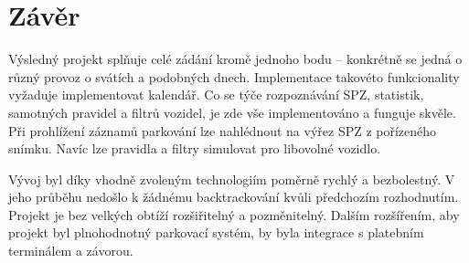 \chapter*{Závěr}

Výsledný projekt splňuje celé zádání kromě jednoho bodu -- konkrétně se jedná o
různý provoz
o svátích a podobných dnech. Implementace takovéto funkcionality
vyžaduje implementovat kalendář.
Co se týče rozpoznávání SPZ, statistik, samotných pravidel a filtrů vozidel, je zde
vše implementováno a funguje skvěle.
Při prohlížení záznamů parkování lze nahlédnout na výřez SPZ z pořízeného snímku.
Navíc lze pravidla a filtry simulovat pro libovolné vozidlo.

Vývoj byl díky vhodně zvoleným technologiím poměrně rychlý a bezbolestný.
V jeho průběhu nedošlo k žádnému backtrackování kvůli předchozím rozhodnutím.
Projekt je bez velkých obtíží rozšiřitelný a pozměnitelný.
Dalším rozšířením, aby projekt byl plnohodnotný parkovací systém, by byla
integrace s platebním terminálem a závorou.
